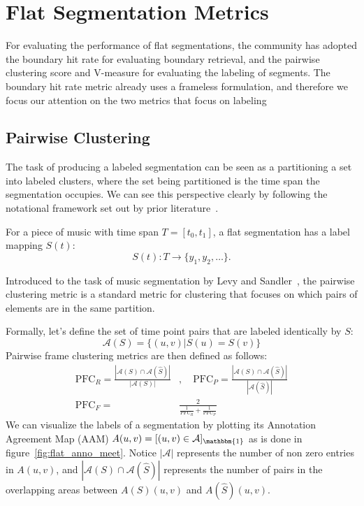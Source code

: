 
\section{Flat Segmentation Metrics}
For evaluating the performance of flat segmentations, the community has adopted the boundary hit rate for evaluating boundary retrieval, and the pairwise clustering score and V-measure for evaluating the labeling of segments.
The boundary hit rate metric already uses a frameless formulation, and therefore we focus our attention on the two metrics that focus on labeling

\subsection{Pairwise Clustering}
The task of producing a labeled segmentation can be seen as a partitioning a set into labeled clusters, where the set being partitioned is the time span the segmentation occupies.
We can see this perspective clearly by following the notational framework set out by prior literature~\cite{DBLP:journals/tismir/NietoMWSSGM20,DBLP:journals/tismir/KinnairdM21}.


For a piece of music with time span \(T = [t_0, t_1]\), a flat segmentation has a label mapping $S(t)$:
\begin{equation}
    S(t): T \to \{y_1, y_2, \ldots\}.
    \label{eq:S}
\end{equation}

Introduced to the task of music segmentation by Levy and Sandler~\cite{levy2008structural}, the pairwise clustering metric is a standard metric for clustering that focuses on which pairs of elements are in the same partition.

Formally, let's define the set of time point pairs that are labeled identically by $S$: 
$$\mathcal{A}(S)= \{(u, v)|S(u)=S(v)\}$$
Pairwise frame clustering metrics are then defined as follows: 
\begin{align*}
\text{PFC}_R = \frac{|\mathcal{A}(S) \cap \mathcal{A}(\hat{S})|}{|\mathcal{A}(S)|}&, \quad
\text{PFC}_P = \frac{|\mathcal{A}(S) \cap \mathcal{A}(\hat{S})|}{|\mathcal{A}(\hat{S})|} \\
\text{PFC}_F = &\frac{2}{\frac1{\text{PFC}_R} + \frac1{\text{PFC}_P}}
\end{align*}
We can visualize the labels of a segmentation by plotting its Annotation Agreement Map (AAM) $A(u, v) = [(u, v) \in \mathcal{A}]_\mathbbm{1}$ as is done in figure~\ref{fig:flat_anno_meet}.
Notice $|\mathcal{A}|$ represents the number of non zero entries in $A(u, v)$, and $|\mathcal{A}(S) \cap \mathcal{A}(\hat{S})|$ represents the number of pairs in the overlapping areas between $A(S)(u, v)$ and $A(\hat{S})(u, v)$.

